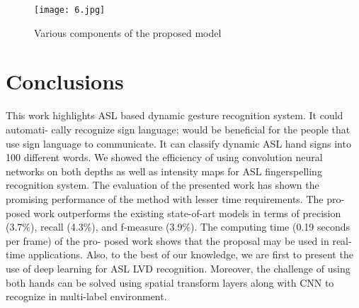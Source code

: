 \documentclass[
  manuscript=article,  %
  layout=preprint,  %
  year=20xx,
  volume=x,
]{extra/ledger}
\begin{document}
\begin{figure}[h!]
    \centering
    \texttt{[image: 6.jpg]}
    \caption{Various components of the proposed model}
    \label{f3}
\end{figure}

































\section{Conclusions}
This work highlights ASL based dynamic gesture recognition system. It could automati- cally recognize sign language; would be beneficial for the people that use sign language to communicate. It can classify dynamic ASL hand signs into 100 different words. We showed the efficiency of using convolution neural networks on both depths as well as intensity maps for ASL fingerspelling recognition system. The evaluation of the presented work has shown the promising performance of the method with lesser time requirements. The pro- posed work outperforms the existing state-of-art models in terms of precision (3.7\%), recall (4.3\%), and f-measure (3.9\%). The computing time (0.19 seconds per frame) of the pro- posed work shows that the proposal may be used in real-time applications. Also, to the best of our knowledge, we are first to present the use of deep learning for ASL LVD recognition. Moreover, the challenge of using both hands can be solved using spatial transform layers along with CNN to recognize in multi-label environment.




\end{document}
